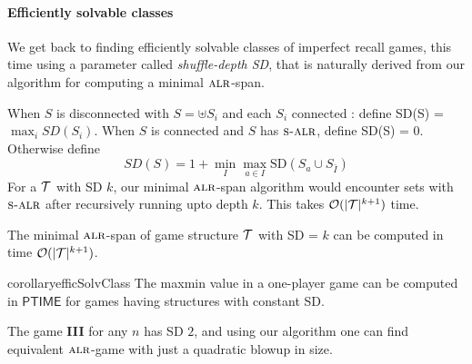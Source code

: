

\paragraph*{Efficiently solvable classes}
\label{sec:tractable}

We get back to finding efficiently solvable classes of imperfect recall games, this time using a parameter called \emph{shuffle-depth SD}, that is naturally derived from our algorithm for computing a minimal $\textsc{alr}$-span. 


When $S$ is disconnected with $S = \uplus S_i$ and each $S_i$ connected : define
SD(S) = $\max_i SD(S_i)$. 
When $S$ is connected and $S$ has $\textsc{s-alr}$, define SD(S) = 0.
Otherwise define
\[
SD(S) = 1 + \min_{I}\max_{a \in I}\text{SD}(S_a \cup S_{\bar{I}})
\]
For a $\mathcal{T}$ with SD $k$, our minimal $\textsc{alr}$-span algorithm would encounter sets with $\textsc{s-alr}$ after recursively
running upto depth $k$. This takes $\mathcal{O}(|\mathcal{T}|^{k+1})$ time. %



\begin{proposition}
The minimal $\textsc{alr}$-span of game structure $\mathcal{T}$ with SD = $k$ can be computed in time $\mathcal{O}(|\mathcal{T}|^{k+1})$.
\end{proposition}

\begin{restatable}{corollary}{efficSolvClass}\label{cor:effic-solv-class}
The maxmin value in a one-player game can be computed in $\mathsf{PTIME}$ for games having structures with constant SD.
\end{restatable}


The game \textbf{III} for any $n$ has SD $2$, and using our algorithm one can find equivalent $\textsc{alr}$-game with just a quadratic blowup in size. 